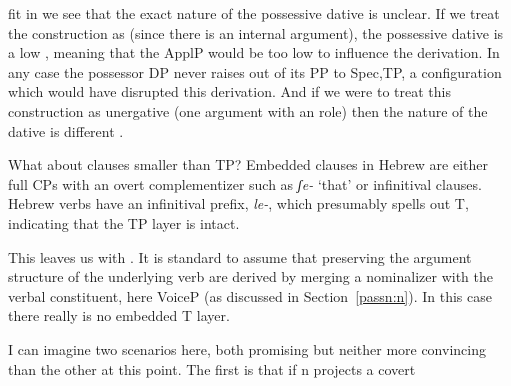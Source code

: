 \begin{exe}
\begin{xlist}
\begin{xlist}
\begin{exe}
\begin{xlist}
\begin{xlist}
\begin{exe}
\begin{xlist}
\begin{xlist}
\begin{exe}
\begin{exe}
\begin{xlist}
\begin{exe}
\begin{exe}
\begin{xlist}
\begin{exe}
\begin{exe}
\begin{exe}
\begin{exe}
\begin{exe}
\begin{xlist}
\begin{exe}
\begin{xlist}
\begin{exe}
\begin{exe}
\begin{xlist}
\begin{exe}
\begin{xlist}
\begin{exe}
\begin{xlist}
\begin{exe}
\begin{exe}
\begin{exe}
\begin{xlist}
\begin{exe}
\begin{exe}
\begin{exe}
\begin{xlist}
\begin{exe}
\begin{xlist}
\begin{exe}
\begin{exe}
\begin{xlist}
\begin{exe}
\begin{exe}
\begin{exe}
\begin{exe}
\begin{xlist}
\begin{exe}
\begin{xlist}
\begin{exe}
\begin{xlist}
\begin{exe}
\begin{xlist}
\begin{exe}
\begin{xlist}
\begin{exe}
\begin{xlist}
\begin{exe}
\begin{exe}
\begin{xlist}
\begin{exe}
\begin{xlist}
\begin{exe}
\begin{exe}
\begin{xlist}
\begin{exe}
\begin{xlist}
\begin{exe}
\begin{exe}
\begin{exe}
\begin{exe}
\begin{xlist}
\begin{xlist}
\begin{exe}
\begin{xlist}
\begin{exe}
\begin{exe}
\begin{exe}
\begin{xlist}
\begin{exe}
\begin{exe}
\begin{xlist}
\begin{exe}
\begin{exe}
\begin{exe}
\begin{xlist}
\begin{xlist}
\begin{exe}
\begin{xlist}
\begin{exe}
\begin{exe}
\begin{exe}
\begin{exe}
\begin{xlist}
\begin{exe}
\begin{xlist}
\begin{exe}
\begin{xlist}
\begin{exe}
\begin{xlist}
\begin{exe}
\begin{exe}
\begin{exe}
fit in we see that the exact nature of the possessive dative is unclear. If we treat the construction as  (since there is an internal argument), the possessive dative is a low , meaning that the ApplP would be too low to influence the derivation. In any case the possessor DP never raises out of its  PP to Spec,TP, a configuration which would have disrupted this derivation. And if we were to treat this construction as unergative (one argument with an  role) then the nature of the dative is different \citep{barashersiegalboneh15,barashersiegalboneh16}.

What about clauses smaller than TP? Embedded clauses in Hebrew are either full CPs with an overt complementizer such as \emph{ʃe-} `that' or infinitival clauses. Hebrew verbs have an infinitival prefix, \emph{le-}, which presumably spells out T, indicating that the TP layer is intact.\largerpage[-2]

 \begin{exe}
	
 \z 

This leaves us with . It is standard to assume that  preserving the argument structure of the underlying verb are derived by merging a nominalizer with the verbal constituent, here VoiceP (as discussed in Section~\ref{passn:n}). In this case there really is no embedded T layer.

I can imagine two scenarios here, both promising but neither more convincing than the other at this point. The first is that if n projects a covert 
\end{exe}
\end{exe}
\end{exe}
\end{exe}
\end{xlist}
\end{exe}
\end{xlist}
\end{exe}
\end{xlist}
\end{exe}
\end{xlist}
\end{exe}
\end{exe}
\end{exe}
\end{exe}
\end{xlist}
\end{exe}
\end{xlist}
\end{xlist}
\end{exe}
\end{exe}
\end{exe}
\end{xlist}
\end{exe}
\end{exe}
\end{xlist}
\end{exe}
\end{exe}
\end{exe}
\end{xlist}
\end{exe}
\end{xlist}
\end{xlist}
\end{exe}
\end{exe}
\end{exe}
\end{exe}
\end{xlist}
\end{exe}
\end{xlist}
\end{exe}
\end{exe}
\end{xlist}
\end{exe}
\end{xlist}
\end{exe}
\end{exe}
\end{xlist}
\end{exe}
\end{xlist}
\end{exe}
\end{xlist}
\end{exe}
\end{xlist}
\end{exe}
\end{xlist}
\end{exe}
\end{xlist}
\end{exe}
\end{exe}
\end{exe}
\end{exe}
\end{xlist}
\end{exe}
\end{exe}
\end{xlist}
\end{exe}
\end{xlist}
\end{exe}
\end{exe}
\end{exe}
\end{xlist}
\end{exe}
\end{exe}
\end{exe}
\end{xlist}
\end{exe}
\end{xlist}
\end{exe}
\end{xlist}
\end{exe}
\end{exe}
\end{xlist}
\end{exe}
\end{xlist}
\end{exe}
\end{exe}
\end{exe}
\end{exe}
\end{exe}
\end{xlist}
\end{exe}
\end{exe}
\end{xlist}
\end{exe}
\end{exe}
\end{xlist}
\end{xlist}
\end{exe}
\end{xlist}
\end{xlist}
\end{exe}
\end{xlist}
\end{xlist}
\end{exe}
